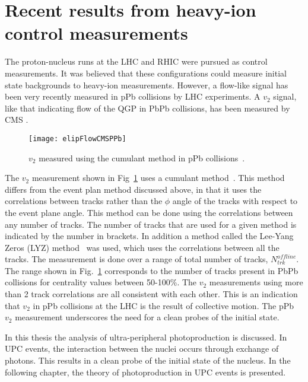   \section{Recent results from heavy-ion control measurements}
    The proton-nucleus runs at the LHC and RHIC were pursued as
      control measurements. 
    It was believed that these configurations could measure 
      initial state backgrounds to heavy-ion measurements.
    However, a flow-like signal has been very recently measured in pPb 
      collisions by LHC experiments.
    A $v_{2}$ signal, like that indicating flow of the QGP in PbPb collisions,
      has been measured by CMS \cite{Chatrchyan:2013nka}.
    \begin{figure}[!Hhbt]
      \centering
      \texttt{[image: elipFlowCMSPPb]}
      \caption{$v_{2}$ measured using the cumulant method in pPb collisions~\cite{Chatrchyan:2013nka}.}
      \label{fig:pPbFlow}
    \end{figure}

    The $v_{2}$ measurement shown in Fig~\ref{fig:pPbFlow} uses a cumulant 
      method~\cite{Borghini:2001zr}.
    This method differs from the event plan method discussed above, in that 
      it uses the correlations between tracks rather than the $\phi$ angle 
      of the tracks with respect to the event plane angle.
    This method can be done using the correlations between any number of 
      tracks. 
    The number of tracks that are used for a given method is 
      indicated by the number in brackets. 
    In addition a method called the Lee-Yang Zeros (LYZ) method~\cite{Borghini:2004ke,Bhalerao:2003yq} was used, 
      which uses the correlations between all the tracks. 
    The measurement is done over a range of total number of tracks, 
      $N^{offline}_{trk}$. 
    The range shown in Fig.~\ref{fig:pPbFlow} corresponds to the number of 
      tracks present in PbPb collisions for centrality values between 50-100\%.
    The $v_{2}$ measurements using more than 2 track correlations are all 
      consistent with each other.
    This is an indication that $v_{2}$ in pPb collisions at the LHC is the
      result of collective motion.
    The pPb $v_{2}$ measurement underscores the need for a clean probes of the 
      initial state. 

    In this thesis the analysis of ultra-peripheral \JPsi{} photoproduction 
      is discussed. 
    In UPC events, the interaction between the nuclei occurs through
      exchange of photons. 
    This results in a clean probe of the initial state of the nucleus.
    In the following chapter, the theory of \JPsi{ } photoproduction in 
      UPC events is presented. 
    

